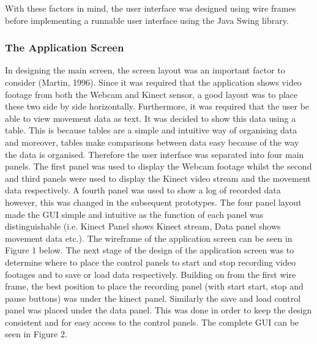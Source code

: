 \documentclass[a4paper, 12pt]{article}
\begin{document}
With these factors in mind, the user interface was designed using wire frames before implementing a runnable user interface using the Java Swing library.

\subsubsection{The Application Screen}

In designing the main screen, the screen layout was an important factor to consider (Martin, 1996). Since it was required that the application shows video footage from both the Webcam and Kinect sensor, a good layout was to place these two side by side horizontally. Furthermore, it was required that the user be able to view movement data as text. It was decided to show this data using a table. This is because tables are a simple and intuitive way of organising data and moreover, tables make comparisons between data easy because of the way the data is organised. Therefore the user interface was separated into four main panels. The first panel was used to display the Webcam footage whilst the second and third panels were used to display the Kinect video stream and the movement data respectively. A fourth panel was used to show a log of recorded data however, this was changed in the subsequent prototypes. The four panel layout made the GUI simple and intuitive as the function of each panel was distinguishable (i.e. Kinect Panel shows Kinect stream, Data panel shows movement data etc.). The wireframe of the application screen can be seen in Figure 1 below. The next stage of the design of the application screen was to determine where to place the control panels to start and stop recording video footages and to save or load data respectively. Building on from the first wire frame, the best position to place the recording panel (with start start, stop and pause buttons) was under the kinect panel. Similarly the save and load control panel was placed under the data panel. This was done in order to keep the design consistent and for easy access to the control panels. The complete GUI can be seen in Figure 2.  
\end{document}
